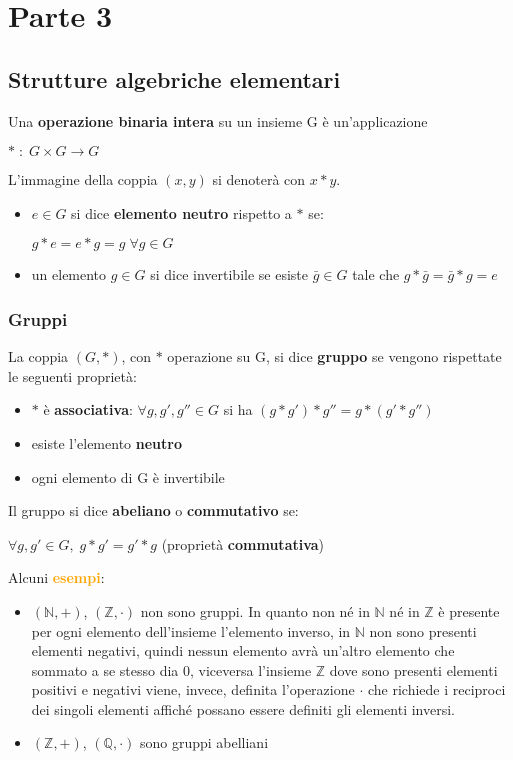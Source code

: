 \chapter{Parte 3}
\section{Strutture algebriche elementari}
Una \textbf{operazione binaria intera} su un insieme G è un'applicazione 
\begin{center}
    $\ast \; : \; G \times G \rightarrow G$
\end{center}
L'immagine della coppia $(x,y)$ si denoterà con $x \ast y$. 
\begin{itemize}[nosep]
    \item $e \in G$ si dice \textbf{elemento neutro} rispetto a $\ast$ se:
    \begin{center}
        $g \ast e = e \ast g = g \; \forall g \in G$
    \end{center}
    \item un elemento $g \in G$ si dice invertibile se esiste $\bar{g} \in G$ tale che $g * \bar{g} = \bar{g} * g = e$
\end{itemize}

\subsection{Gruppi}
La coppia $(G, \ast)$, con $\ast$ operazione su G, si dice \textbf{gruppo} se vengono rispettate le seguenti proprietà:
\begin{itemize}[nosep]
    \item $\ast$ è \textbf{associativa}: $\forall g, g', g'' \in G$ si ha $(g \ast g') \ast g'' = g \ast (g' \ast g'')$
    \item esiste l'elemento \textbf{neutro}
    \item ogni elemento di G è invertibile
\end{itemize}
Il gruppo si dice \textbf{abeliano} o \textbf{commutativo} se: 
\begin{center}
    $\forall g, g' \in G, \; g \ast g' = g' \ast g$ (proprietà \textbf{commutativa})
\end{center}
Alcuni \textcolor{orange}{\textbf{esempi}}:
\begin{itemize}[nosep]
    \item $(\mathbb{N}, +)$, $(\mathbb{Z}, \cdot)$ non sono gruppi. In quanto non né in $\mathbb{N}$ né in $\mathbb{Z}$ è presente per ogni elemento dell'insieme l'elemento inverso, in $\mathbb{N}$ non sono presenti elementi negativi, quindi nessun elemento avrà un'altro elemento che sommato a se stesso dia 0, viceversa l'insieme $\mathbb{Z}$ dove sono presenti elementi positivi e negativi viene, invece, definita l'operazione $\cdot$ che richiede i reciproci dei singoli elementi affiché possano essere definiti gli elementi inversi.
    \item $(\mathbb{Z}, +)$, $(\mathbb{Q}, \cdot)$ sono gruppi abelliani
\end{itemize}

